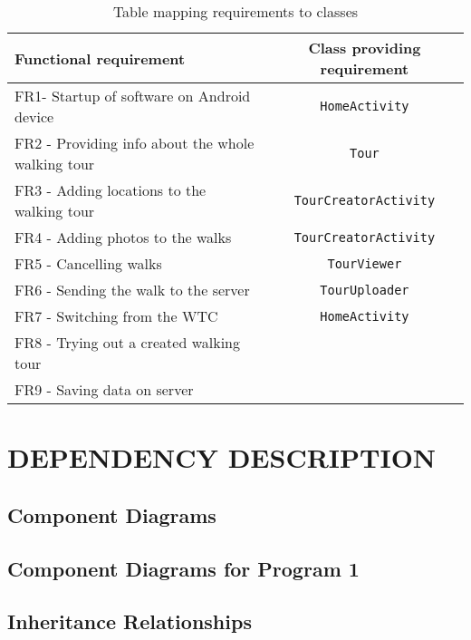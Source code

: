 \documentclass{project}
\newcommand{\code}[1] {\texttt{#1}}
\begin{document}
        \begin{table}[h]
            \caption{Table mapping requirements to classes}
            \centering
            \begin{tabular}{l|c}
            \hline
            \hline
            Functional requirement                            & Class providing requirement \\   [0.5ex] \hline
            FR1- Startup of software on Android device        & \code{HomeActivity}         \\
            FR2 - Providing info about the whole walking tour & \code{Tour}                 \\
            FR3 - Adding locations to the walking tour        & \code{TourCreatorActivity}  \\
            FR4 - Adding photos to the walks                  & \code{TourCreatorActivity}  \\
            FR5 - Cancelling walks                            & \code{TourViewer}           \\
            FR6 - Sending the walk to the server              & \code{TourUploader}         \\
            FR7 - Switching from the WTC                      & \code{HomeActivity}         \\
            FR8 - Trying out a created walking tour           & ~                           \\
            FR9 - Saving data on server                       & ~                           \\
            \end{tabular}
        \end{table}

\section{DEPENDENCY DESCRIPTION}
    \subsection{Component Diagrams}
    \subsection{Component Diagrams for Program 1}
    \subsection{Inheritance Relationships}
\end{document}
